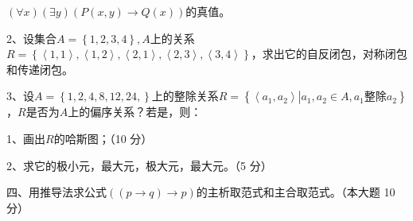\documentclass[fontset=exam]{exam-zh}
\begin{document}
\(\left( {\forall x} \right)\left( {\exists y} \right)\left( P\left( {x,y} \right)\rightarrow Q(x) \right)\)的真值。

2、设集合\(A = \left\{ {1,2,3,4} \right\},A\)上的关系 \(R = \left\{ {\left\langle {1,1} \right\rangle,\left\langle {1,2} \right\rangle,\left\langle {2,1} \right\rangle,\left\langle {2,3} \right\rangle,\left\langle {3,4} \right\rangle} \right\}\)，求出它的自反闭包，对称闭包和传递闭包。

3、设\(A = \left\{ {1,2,4,8,12,24,} \right\}\)上的整除关系\(R = \left\{ {\left\langle {a_{1},a_{2}} \right\rangle\left| {a_{1},a_{2} \in A,a_{1}\text{整除}a_{2}} \right.} \right\}\)，\(R\)是否为\(A\)上的偏序关系？若是，则：

1、画出\(R\)的哈斯图；（10 分）

2、求它的极小元，最大元，极大元，最大元。（5 分）


四、用推导法求公式\(\left( \left( p\rightarrow q \right)\rightarrow p \right)\)的主析取范式和主合取范式。（本大题 10 分）
\end{document}

